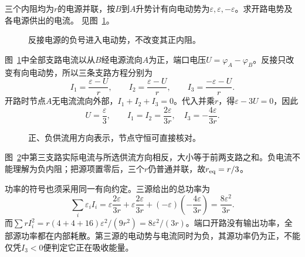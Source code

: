 \begin{exercise}[电源反接后的节点电位]\label{ex:c1-h7}
三个内阻均为$r$的电源并联，按$B$到$A$升势计有向电动势为$\varepsilon,\varepsilon,-\varepsilon$。求开路电势及各电源供出的电流。 见图~\ref{fig:c1-h7-q}。
\end{exercise}

\begin{figure}[H]\centering
{}
\caption{反接电源的负号进入电动势，不改变其正内阻。}\label{fig:c1-h7-q}
\end{figure}
\begin{solution}
图~\ref{fig:c1-h7-q}中全部支路电流以从$B$经电源流向$A$为正，端口电压$U=\varphi_A-\varphi_B$。反接只改变有向电动势，所以三条支路方程分别为
\[
 I_1=\frac{\varepsilon-U}r,\qquad I_2=\frac{\varepsilon-U}r,
 \qquad I_3=\frac{-\varepsilon-U}r.
\]
开路时节点$A$无电流流向外部，$I_1+I_2+I_3=0$。代入并乘$r$，得$\varepsilon-3U=0$，因此
\[
 \boxed{U=\frac\varepsilon3},\qquad
 \boxed{I_1=I_2=\frac{2\varepsilon}{3r},\quad I_3=-\frac{4\varepsilon}{3r}}.
\]
\begin{figure}[H]\centering
{}
\caption{正、负供流用方向表示，节点守恒可直接核对。}\label{fig:c1-h7-s}
\end{figure}
图~\ref{fig:c1-h7-s}中第三支路实际电流与所选供流方向相反，大小等于前两支路之和。负电流不能理解为负内阻；把源项置零后，三个$r$仍普通并联，故$r_{\rm eq}=r/3$。

功率的符号也须采用同一有向约定。三源给出的总功率为
\[
 \sum_i\varepsilon_iI_i
 =\varepsilon\frac{2\varepsilon}{3r}
 +\varepsilon\frac{2\varepsilon}{3r}
 +(-\varepsilon)\left(-\frac{4\varepsilon}{3r}\right)
 =\frac{8\varepsilon^2}{3r}.
\]
而$\sum rI_i^2=r(4+4+16)\varepsilon^2/(9r^2)=8\varepsilon^2/(3r)$。端口开路没有输出功率，全部源功率都在内部耗散。第三源的电动势与电流同时为负，其源功率仍为正，不能仅凭$I_3<0$便判定它正在吸收能量。
\end{solution}

